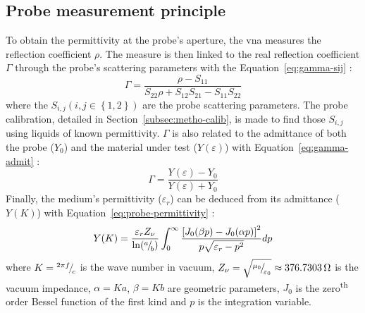 \subsection{Probe measurement principle}\label{metho:probe-princip}
To obtain the permittivity at the probe's aperture, the \ac{vna} measures the reflection coefficient \(\rho\).
The measure is then linked to the real reflection coefficient \(\Gamma\) through the probe's scattering parameters with the Equation~\ref{eq:gamma-sij} \parencite{Nyshadham1992}:
%
\begin{equation}\label{eq:gamma-sij}
    \Gamma = \frac{\rho-S_{11}}{S_{22}\rho+S_{12}S_{21}-S_{11}S_{22}}
\end{equation}
%
where the \(S_{i,j} \left(i,j \in \left\{1,2\right\}\right)\) are the probe scattering parameters.
The probe calibration, detailed in Section~\ref{subsec:metho-calib}, is made to find those \(S_{i,j}\) using liquids of known permittivity.
\(\Gamma\) is also related to the admittance of both the probe (\(Y_0\)) and the material under test (\(Y(\varepsilon)\)) with Equation~\ref{eq:gamma-admit} \parencite{Nyshadham1992}:
%
\begin{equation}\label{eq:gamma-admit}
    \Gamma = \frac{Y(\varepsilon) - Y_0}{Y(\varepsilon) + Y_0}
\end{equation}
%
Finally, the medium's permittivity (\(\varepsilon_r\)) can be deduced from its admittance (\(Y(K)\)) with Equation~\ref{eq:probe-permittivity} \parencite{Galejs1969a}:
%
\begin{equation}\label{eq:probe-permittivity}
    Y(K) = \frac{\varepsilon_r Z_\nu}{\ln(\sidefrac{a}{b})} 
    \int_{0}^{\infty}
    \frac{{\left[J_0(\beta p)-J_0(\alpha p)\right]}^2} %
         {p\sqrt{\varepsilon_r - p^2}}dp
\end{equation}
%
where \(K={}^{2\pi f}{\mskip-3mu/\mskip-3mu}_{c}\) is the wave number in vacuum, \(Z_\nu=\sqrt{{}^{\mu_{0}}{\mskip-3mu/\mskip-3mu}_{\varepsilon_{0}}}\approx \qty{376.7303}{\ohm}\) is the vacuum impedance, \(\alpha = Ka\), \(\beta = Kb\) are geometric parameters, \(J_{0}\) is the zero\textsuperscript{th} order Bessel function of the first kind and \(p\) is the integration variable.  %

